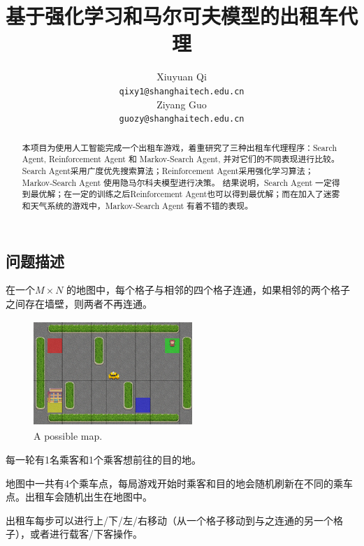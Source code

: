 \documentclass{article}
\title{基于强化学习和马尔可夫模型的出租车代理}
\author{
  Xiuyuan Qi \\
  \texttt{qixy1@shanghaitech.edu.cn} \\
  \And
  Ziyang Guo \\
  \texttt{guozy@shanghaitech.edu.cn} \\
}
\begin{document}
\begin{CJK}{UTF8}{gbsn}


\maketitle


\begin{abstract} 
  本项目为使用人工智能完成一个出租车游戏，着重研究了三种出租车代理程序：Search Agent, Reinforcement Agent 和 Markov-Search Agent, 
  并对它们的不同表现进行比较。
  Search Agent采用广度优先搜索算法；Reinforcement Agent采用强化学习算法；Markov-Search Agent 使用隐马尔科夫模型进行决策。
  结果说明，Search Agent 一定得到最优解；在一定的训练之后Reinforcement Agent也可以得到最优解；而在加入了迷雾和天气系统的游戏中，Markov-Search Agent 有着不错的表现。
\end{abstract}


\section{问题描述}
在一个$M\times N$ 的地图中，每个格子与相邻的四个格子连通，如果相邻的两个格子之间存在墙壁，则两者不再连通。

\begin{figure}[htbp]
  \centering
  \includegraphics[width=6cm,height=4cm]{images/map.png}
  \caption{A possible map.}
\end{figure}
每一轮有1名乘客和1个乘客想前往的目的地。

​地图中一共有4个乘车点，每局游戏开始时乘客和目的地会随机刷新在不同的乘车点。出租车会随机出生在地图中。 

出租车每步可以进行上/下/左/右移动（从一个格子移动到与之连通的另一个格子），或者进行载客/下客操作。 


\end{CJK}
\end{document}
